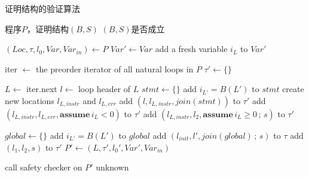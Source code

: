 \begin{algorithm}[ht]
  \caption{证明结构的验证算法}
  \label{alg:chap3-proof-structure}
  \begin{algorithmic}
    \REQUIRE 程序$P$，证明结构$(B, S)$
    \ENSURE $(B, S)$是否成立

    \STATE $(Loc, \tau, l_0, Var, Var_{in}) \leftarrow P$
    \STATE $Var' \leftarrow Var$
        \STATE add a fresh variable $i_L$ to $Var'$ 
    \ENDFOR
    
    \STATE iter $\leftarrow$ the preorder iterator of all natural loops in $P$ 
    \STATE $\tau' \leftarrow \{\}$
    
        \STATE $L \leftarrow$ iter.next     
        \STATE $l \leftarrow$ loop header of $L$
        \STATE $stmt \leftarrow \{\}$ 
            \STATE add $i_{L'} = B(L')$ to $stmt$
        \ENDFOR
        \STATE create new locations $l_{L, instr}$ and $l_{L, err}$
        \STATE add $(l, l_{L, instr}, join(stmt))$ to $\tau'$
        \STATE add $(l_{L, instr}, l_{L, err}, \mathbf{assume} \, i_L < 0)$ to $\tau'$
            \STATE add $(l_{L, instr}, l_2, \mathbf{assume}\, i_L \geq 0\,\mathbf{;}\,s)$ to $\tau'$ 
        \ENDFOR
    \ENDWHILE
    
    \STATE $global \leftarrow \{\}$ 
        \STATE add $i_{L'} = B(L')$ to $global$
    \ENDFOR
        \STATE add $(l_{init}, l', join(global)\,\mathbf{;}\,s)$ to $\tau$
    \ENDFOR
        \STATE add $(l_1, l_2, s)$ to $\tau'$
    \ENDFOR
    \STATE $P' \leftarrow (L, \tau', l_0', Var', Var_{in})$
    
    \STATE call safety checker on $P'$ 
        \RETURN \TRUE
        \RETURN \FALSE
        \RETURN unknown
    \ENDIF
  \end{algorithmic}
\end{algorithm}
